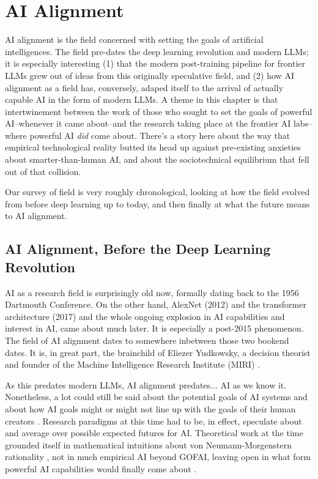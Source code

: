 \chapter{AI Alignment}\label{ch_ai_alignment}

AI alignment is the field concerned with setting the goals of artificial
intelligences. The field pre-dates the deep learning revolution and modern
LLMs; it is especially interesting (1) that the modern post-training pipeline
for frontier LLMs grew out of ideas from this originally speculative field, and
(2) how AI alignment as a field has, conversely, adaped itself to the arrival
of actually capable AI in the form of modern LLMs. A theme in this chapter is
that intertwinement between the work of those who sought to set the goals of
powerful AI--whenever it came about--and the research taking place at the
frontier AI labs--where powerful AI \emph{did} come about. There's a story here
about the way that empirical technological reality butted its head up against
pre-existing anxieties about smarter-than-human AI, and about the
sociotechnical equilibrium that fell out of that collision.

Our survey of field is very roughly chronological, looking at how the field
evolved from before deep learning up to today, and then finally at what the
future means to AI alignment.

\section{AI Alignment, Before the Deep Learning Revolution}
AI as a research field is surprisingly old now, formally dating back to the
1956 Dartmouth Conference. On the other hand, AlexNet (2012)
\cite{krizhevsky2012imagenet} and the transformer architecture (2017)
\cite{vaswani2017attention} and the whole ongoing explosion in AI capabilities
and interest in AI, came about much later. It is especially a post-2015
phenomenon. The field of AI alignment dates to somewhere inbetween those two
bookend dates. It is, in great part, the brainchild of Eliezer Yudkowsky, a
decision theorist and founder of the Machine Intelligence Research Institute
(MIRI) \cite{yudkowsky2008factor}.

As this predates modern LLMs, AI alignment predates... AI as we know it.
Nonetheless, a lot could still be said about the potential goals of AI systems
and about how AI goals might or might not line up with the goals of their human
creators
\cite{bostrom2014superintelligence,omohundro2008drives,yudkowsky2008factor}.
Research paradigms at this time had to be, in effect, speculate about and
average over possible expected futures for AI. Theoretical work at the time
grounded itself in mathematical intuitions about von Neumann-Morgenstern
rationality \cite{von1944games}, not in much empirical AI beyond GOFAI, leaving
open in what form powerful AI capabilities would finally come about
\cite{soares2015corrigibility}.

